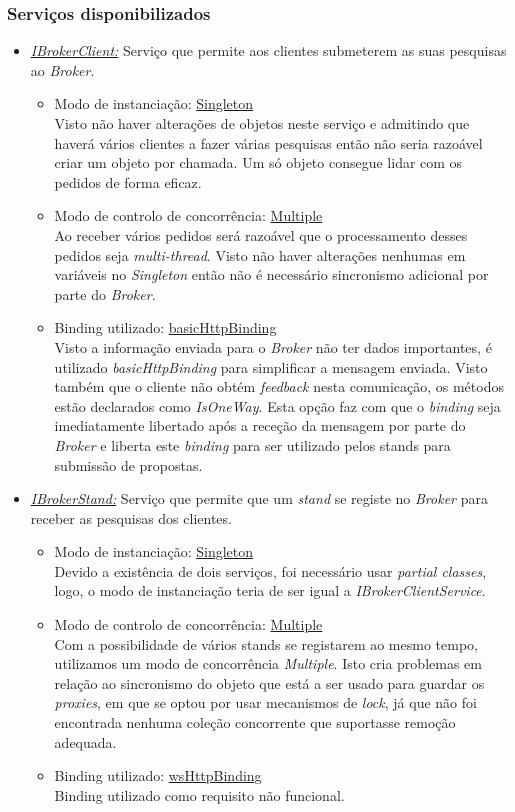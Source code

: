 \documentclass[a4paper]{article}
\begin{document}
\subsubsection{Serviços disponibilizados}
\begin{itemize} 

\item
\emph{\underline{IBrokerClient:}}
Serviço que permite aos clientes submeterem as suas pesquisas ao \emph{Broker}.
	\begin{itemize}
		\item
		Modo de instanciação: \underline{Singleton}\\
		Visto não haver alterações de objetos neste serviço e admitindo que haverá vários clientes a fazer várias pesquisas então não seria razoável criar um objeto por chamada. Um só objeto consegue lidar com os pedidos de forma eficaz.
		\item
		Modo de controlo de concorrência: \underline{Multiple}\\
		Ao receber vários pedidos será razoável que o processamento desses pedidos seja \emph{multi-thread}. Visto não haver alterações nenhumas em variáveis no \emph{Singleton} então não é necessário sincronismo adicional por parte do \emph{Broker}.
		\item
		Binding utilizado: \underline{basicHttpBinding}\\
		Visto a informação enviada para o \emph{Broker} não ter dados importantes, é utilizado \emph{basicHttpBinding} para simplificar a mensagem enviada. Visto também que o cliente não obtém \emph{feedback} nesta comunicação, os métodos estão declarados como \emph{IsOneWay}. Esta opção faz com que o \emph{binding} seja imediatamente libertado após a receção da mensagem por parte do \emph{Broker} e liberta este \emph{binding} para ser utilizado pelos stands para submissão de propostas.
	\end{itemize}
\item
\emph{\underline{IBrokerStand:}}
Serviço que permite que um \emph{stand} se registe no \emph{Broker} para receber as pesquisas dos clientes.
		\begin{itemize}
		\item
		Modo de instanciação: \underline{Singleton}\\
		Devido a existência de dois serviços, foi necessário usar \emph{partial classes}, logo, o modo de instanciação teria de ser igual a \emph{IBrokerClientService}.
		\item
		Modo de controlo de concorrência: \underline{Multiple}\\
		Com a possibilidade de vários stands se registarem ao mesmo tempo, utilizamos um modo de concorrência \emph{Multiple}. Isto cria problemas em relação ao sincronismo do objeto que está a ser usado para guardar os \emph{proxies}, em que se optou por usar mecanismos de \emph{lock}, já que não foi encontrada nenhuma coleção concorrente que suportasse remoção adequada.
		
		\item
		Binding utilizado: \underline{wsHttpBinding}\\
		Binding utilizado como requisito não funcional.
	\end{itemize}
\end{itemize}
\end{document}
